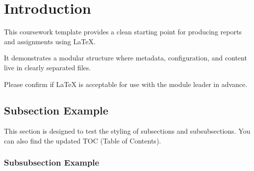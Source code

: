 \section{Introduction}

This coursework template provides a clean starting point for producing reports and assignments using \LaTeX.

It demonstrates a modular structure where metadata, configuration, and content live in clearly separated files.

\begin{keypoint}
Please confirm if {\LaTeX} is acceptable for use with the module leader in advance.
\end{keypoint}

\subsection{Subsection Example}

This section is designed to test the styling of subsections and subsubsections. You can also find the updated TOC (Table of Contents).

\subsubsection{Subsubsection Example}

